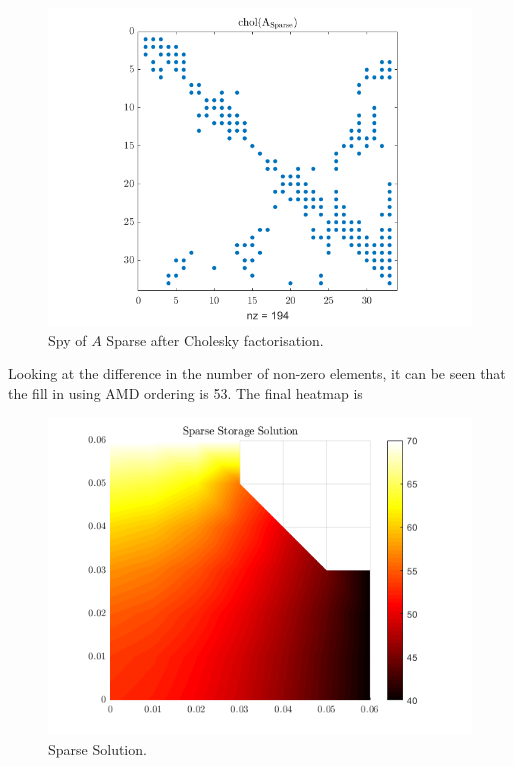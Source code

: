 \documentclass[12pt,a4paper]{article}
\begin{document}
\begin{figure}[H]
	\includegraphics[width=\linewidth]{images/A_SPARSE_CHOL.png}
	\caption{Spy of $A$ Sparse after Cholesky factorisation.}
	\label{fig:A_SPARSE_CHOL}
\end{figure}
Looking at the difference in the number of non-zero elements, it can be seen that the fill in using AMD ordering is 53. The final heatmap is
\begin{figure}[H]
	\includegraphics[width=\linewidth]{images/sparsestorage.png}
	\caption{Sparse Solution.}
	\label{fig:sparsestorage}
\end{figure}
\end{document}
